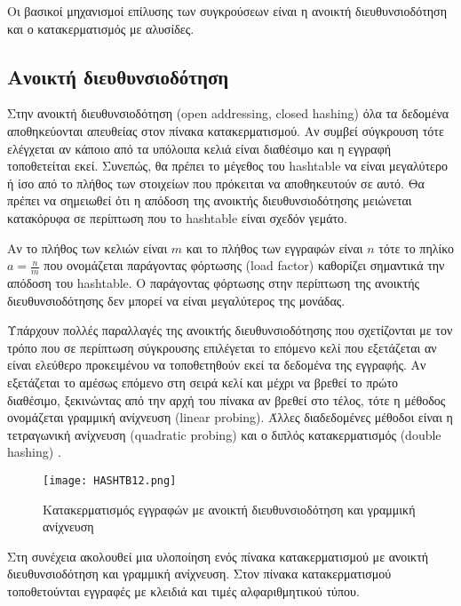Οι βασικοί μηχανισμοί επίλυσης των συγκρούσεων είναι η ανοικτή διευθυνσιοδότηση και ο κατακερματισμός με αλυσίδες.

\subsection{Ανοικτή διευθυνσιοδότηση}
Στην ανοικτή διευθυνσιοδότηση (open addressing, closed hashing) όλα τα δεδομένα αποθηκεύονται απευθείας στον πίνακα κατακερματισμού. Αν συμβεί σύγκρουση τότε ελέγχεται αν κάποιο από τα υπόλοιπα κελιά είναι διαθέσιμο και η εγγραφή τοποθετείται εκεί. Συνεπώς, θα πρέπει το μέγεθος του hashtable να είναι μεγαλύτερο ή ίσο από το πλήθος των στοιχείων που πρόκειται να αποθηκευτούν σε αυτό. Θα πρέπει να σημειωθεί ότι η απόδοση της ανοικτής διευθυνσιοδότησης μειώνεται κατακόρυφα σε περίπτωση που το hashtable είναι σχεδόν γεμάτο. 

Αν το πλήθος των κελιών είναι $m$ και το πλήθος των εγγραφών είναι $n$ τότε το πηλίκο $a=\frac{n}{m}$ που ονομάζεται παράγοντας φόρτωσης (load factor) καθορίζει σημαντικά την απόδοση του hashtable. Ο παράγοντας φόρτωσης στην περίπτωση της ανοικτής διευθυνσιοδότησης δεν μπορεί να είναι μεγαλύτερος της μονάδας.

Υπάρχουν πολλές παραλλαγές της ανοικτής διευθυνσιοδότησης που σχετίζονται με τον τρόπο που σε περίπτωση σύγκρουσης επιλέγεται το επόμενο κελί που εξετάζεται αν είναι ελεύθερο προκειμένου να τοποθετηθούν εκεί τα δεδομένα της εγγραφής. Αν εξετάζεται το αμέσως επόμενο στη σειρά κελί και μέχρι να βρεθεί το πρώτο διαθέσιμο, ξεκινώντας από την αρχή του πίνακα αν βρεθεί στο τέλος, τότε η μέθοδος ονομάζεται γραμμική ανίχνευση (linear probing). Άλλες διαδεδομένες μέθοδοι είναι η τετραγωνική ανίχνευση (quadratic probing) και ο διπλός κατακερματισμός (double hashing) \cite{visualalgo_hashtables}.

\begin{figure}[ht!]
\centering
\texttt{[image: HASHTB12.png]}
\caption{Κατακερματισμός εγγραφών με ανοικτή διευθυνσιοδότηση και γραμμική ανίχνευση \cite{wiki_hashtables}}
\label{fig:hashtable2}
\end{figure}

Στη συνέχεια ακολουθεί μια υλοποίηση ενός πίνακα κατακερματισμού με ανοικτή διευθυνσιοδότηση και γραμμική ανίχνευση. Στον πίνακα κατακερματισμού τοποθετούνται εγγραφές με κλειδιά και τιμές αλφαριθμητικού τύπου. 



